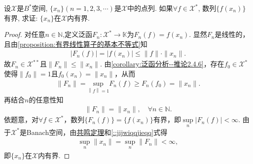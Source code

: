 \documentclass[../../main.tex]{subfiles}%
\begin{document}
\begin{example}
设$\mathscr{X}$是$B^*$空间, $\{x_n\}(n=1,2,3,\cdots)$是$\mathscr{X}$中的点列. 如果$\forall f \in \mathscr{X}^*$, 数列$\{f(x_n)\}$有界, 求证: $\{x_n\}$在$\mathscr{X}$内有界.
\end{example}
\begin{proof}
对任意$n\in\mathbb{N}$,定义泛函$F_n:\mathscr{X}^*\to\mathbb{K}$为$F_n(f)=f(x_n)$. 显然$F_n$是线性的，且由\cref{proposition:有界线性算子的基本不等式}知
\begin{align*}
|F_n(f)|=|f(x_n)|\leqslant\|f\|\cdot\|x_n\|.
\end{align*}
故$F_n\in\mathscr{X}^{**}$且$\|F_n\|\leqslant\|x_n\|$. 由\cref{corollary:泛函分析--推论2.4.6}，存在$f_0\in\mathscr{X}^*$使得$\|f_0\|=1$且$f_0(x_n)=\|x_n\|$，从而
\begin{align*}
\|F_n\|=\underset{\left\| f \right\| =1}{\mathrm{sup}}F_n\left( f \right) \geqslant F_n(f_0)=\|x_n\|.
\end{align*}
再结合$n$的任意性知
\begin{align}\label{::jijwiqqjieqq}
\|F_n\|=\|x_n\|,\quad \forall n\in \mathbb{N}.
\end{align}
依题意，对$\forall f\in\mathscr{X}^*$，数列$\{F_n(f)\}=\{f(x_n)\}$有界，即$\sup\limits_{n}|F_n(f)|<\infty$. 由于$\mathscr{X}^*$是Banach空间，由\hyperref[theorem:泛函分析--共鸣定理]{共鸣定理}和\eqref{::jijwiqqjieqq}式得
\begin{align*}
\sup\limits_{n}\|x_n\|=\sup\limits_{n}\|F_n\|<\infty,
\end{align*}
即$\{x_n\}$在$\mathscr{X}$内有界.
\end{proof}
\end{document}
